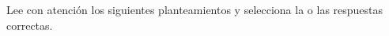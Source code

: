 \question Lee con atención los siguientes planteamientos y selecciona la o las respuestas correctas.

\begin{parts}
    
    
    
    
    
    
    
\end{parts}